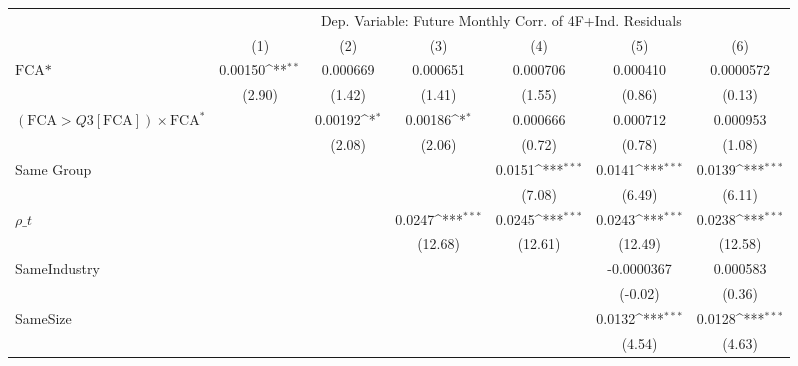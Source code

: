 {
\def\sym#1{\ifmmode^{#1}\else\(^{#1}\)\fi}
\begin{tabular}{l*{6}{c}}
\hline\hline
                &\multicolumn{6}{c}{Dep. Variable: Future Monthly Corr. of 4F+Ind. Residuals}                                     \\\cmidrule(lr){2-7}
                &\multicolumn{1}{c}{(1)}         &\multicolumn{1}{c}{(2)}         &\multicolumn{1}{c}{(3)}         &\multicolumn{1}{c}{(4)}         &\multicolumn{1}{c}{(5)}         &\multicolumn{1}{c}{(6)}         \\
\hline
$ \text{FCA*} $ &  0.00150\sym{**} & 0.000669         & 0.000651         & 0.000706         & 0.000410         &0.0000572         \\
                &   (2.90)         &   (1.42)         &   (1.41)         &   (1.55)         &   (0.86)         &   (0.13)         \\
[1em]
 $ (\text{FCA} > Q3[\text{FCA}]) \times {\text{FCA} ^*}  $ &                  &  0.00192\sym{*}  &  0.00186\sym{*}  & 0.000666         & 0.000712         & 0.000953         \\
                &                  &   (2.08)         &   (2.06)         &   (0.72)         &   (0.78)         &   (1.08)         \\
[1em]
Same Group      &                  &                  &                  &   0.0151\sym{***}&   0.0141\sym{***}&   0.0139\sym{***}\\
                &                  &                  &                  &   (7.08)         &   (6.49)         &   (6.11)         \\
[1em]
 $ {\rho\_t} $   &                  &                  &   0.0247\sym{***}&   0.0245\sym{***}&   0.0243\sym{***}&   0.0238\sym{***}\\
                &                  &                  &  (12.68)         &  (12.61)         &  (12.49)         &  (12.58)         \\
[1em]
SameIndustry    &                  &                  &                  &                  &-0.0000367         & 0.000583         \\
                &                  &                  &                  &                  &  (-0.02)         &   (0.36)         \\
[1em]
SameSize        &                  &                  &                  &                  &   0.0132\sym{***}&   0.0128\sym{***}\\
                &                  &                  &                  &                  &   (4.54)         &   (4.63)         \\

\end{tabular}}
